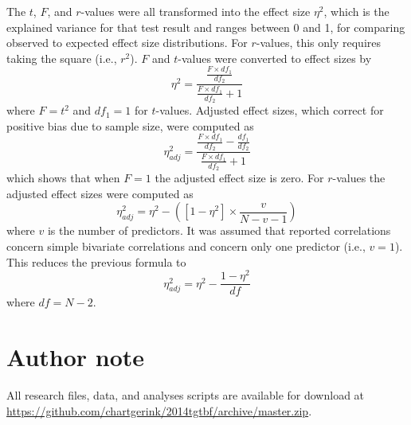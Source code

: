 \documentclass{article}
\begin{document}
The $t$, $F$, and $r$-values were all transformed into the effect size $\eta^2$, which is the explained variance for that test result and ranges between 0 and 1, for comparing observed to expected effect size distributions. For $r$-values, this only requires taking the square (i.e., $r^2$). $F$ and $t$-values were converted to effect sizes by
\begin{equation}
\eta^2=\frac{\frac{F\times df_1}{df_2}}{\frac{F\times df_1}{df_2}+1}
\label{eq:b1}
\end{equation}
where $F=t^2$ and $df_1=1$ for $t$-values. Adjusted effect sizes, which correct for positive bias due to sample size, were computed as
\begin{equation}
\eta^2_{adj}=\frac{\frac{F\times df_1}{df_2}-\frac{df_1}{df_2}}{\frac{F\times df_1}{df_2}+1}
\label{eq:b2}
\end{equation}
which shows that when $F=1$ the adjusted effect size is zero. For $r$-values the adjusted effect sizes were computed as \cite{Ivarsson2013-rm}
\begin{equation}
\eta^2_{adj}=\eta^2-([1-\eta^2]\times\frac{v}{N-v-1})
\label{eq:b3}
\end{equation}
where $v$ is the number of predictors. It was assumed that reported correlations concern simple bivariate correlations and concern only one predictor (i.e., $v=1$). This reduces the previous formula to
\begin{equation}
\eta^2_{adj}=\eta^2-\frac{1-\eta^2}{df}
\label{eq:b4}
\end{equation}
where $df=N-2$.


\section*{Author note}
All research files, data, and analyses scripts are available for download at \url{https://github.com/chartgerink/2014tgtbf/archive/master.zip}. 
\end{document}
